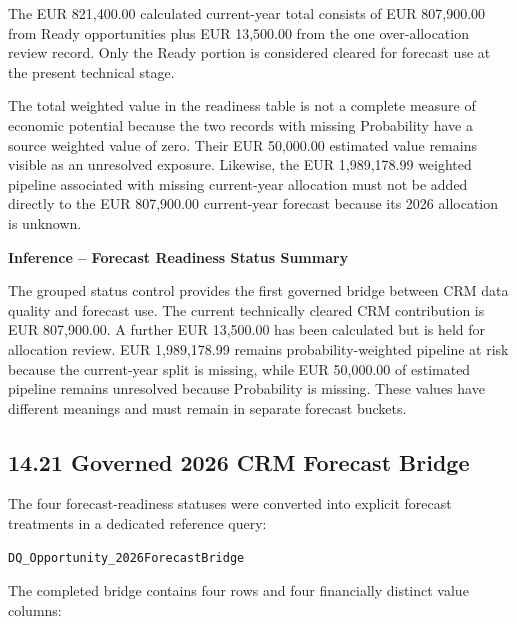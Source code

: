 \documentclass[11pt,a4paper]{article}
\begin{document}
The EUR 821,400.00 calculated current-year total consists of EUR 807,900.00
from Ready opportunities plus EUR 13,500.00 from the one over-allocation review
record. Only the Ready portion is considered cleared for forecast use at the
present technical stage.

\begin{warningbox}

The total weighted value in the readiness table is not a complete measure of
economic potential because the two records with missing Probability have a source
weighted value of zero. Their EUR 50,000.00 estimated value remains visible as an
unresolved exposure. Likewise, the EUR 1,989,178.99 weighted pipeline associated
with missing current-year allocation must not be added directly to the
EUR 807,900.00 current-year forecast because its 2026 allocation is unknown.

\end{warningbox}

\begin{inferencebox}

\textbf{Inference -- Forecast Readiness Status Summary}

The grouped status control provides the first governed bridge between CRM data
quality and forecast use. The current technically cleared CRM contribution is
EUR 807,900.00. A further EUR 13,500.00 has been calculated but is held for
allocation review. EUR 1,989,178.99 remains probability-weighted pipeline at
risk because the current-year split is missing, while EUR 50,000.00 of estimated
pipeline remains unresolved because Probability is missing. These values have
different meanings and must remain in separate forecast buckets.

\end{inferencebox}

\subsection{14.21 Governed 2026 CRM Forecast Bridge}

The four forecast-readiness statuses were converted into explicit forecast
treatments in a dedicated reference query:

\begin{lstlisting}[style=powerquery]
DQ_Opportunity_2026ForecastBridge
\end{lstlisting}

The completed bridge contains four rows and four financially distinct value
columns:
\end{document}
